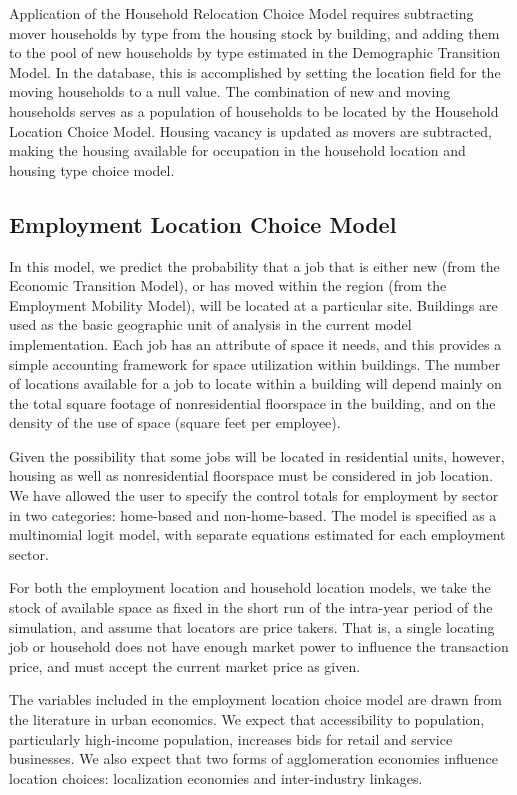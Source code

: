Application of the Household Relocation Choice Model requires subtracting
mover households by type from the housing stock by building, and
adding them to the pool of new households by type estimated in the
Demographic Transition Model. In the database, this is
accomplished by setting the location field for the moving
households to a null value.  The combination of new and moving
households serves as a population of households to be located by
the Household Location Choice Model. Housing vacancy is updated as
movers are subtracted, making the housing available for occupation
in the household location and housing type choice model.


\subsection{Employment Location Choice Model}

In this model, we predict the probability that a job that is
either new (from the Economic Transition Model), or has moved
within the region (from the Employment Mobility Model), will be
located at a particular site.  Buildings are used as the basic
geographic unit of analysis in the current model implementation.
Each job has an attribute of space it needs, and this provides
a simple accounting framework for space utilization within
buildings. The
number of locations available for a job to locate within a building
will depend mainly on the total square footage of
nonresidential floorspace in the building, and on the density of the
use of space (square feet per employee).

Given the possibility
that some jobs will be located in residential units, however,
housing as well as nonresidential floorspace must be considered in
job location.  We have allowed the user to specify the control totals
for employment by sector in two categories: home-based and
non-home-based.  The model is specified as a multinomial logit model,
with separate equations estimated for each employment sector.


For both the employment location and household location models, we
take the stock of available space as fixed in the short run of the
intra-year period of the simulation, and assume that locators are
price takers.  That is, a single locating job or household does
not have enough market power to influence the transaction price,
and must accept the current market price as given.

The variables included in the employment location choice model are
drawn from the literature in urban economics.  We expect that
accessibility to population, particularly high-income population,
increases bids for retail and service businesses.  We also expect
that two forms of agglomeration economies influence location
choices: localization economies and inter-industry linkages.

